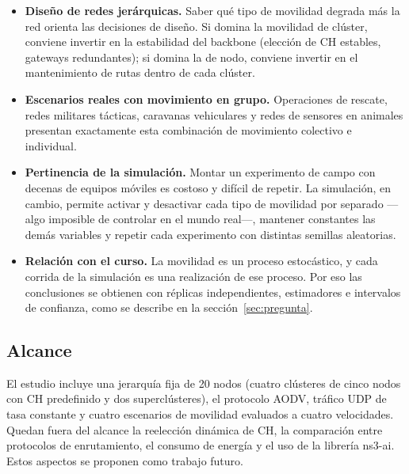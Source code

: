 \begin{itemize}
    \item \textbf{Diseño de redes jerárquicas.} Saber qué tipo de movilidad degrada más
    la red orienta las decisiones de diseño. Si domina la movilidad de clúster, conviene
    invertir en la estabilidad del backbone (elección de CH estables, gateways
    redundantes); si domina la de nodo, conviene invertir en el mantenimiento de rutas
    dentro de cada clúster.
    \item \textbf{Escenarios reales con movimiento en grupo.} Operaciones de rescate,
    redes militares tácticas, caravanas vehiculares y redes de sensores en animales
    presentan exactamente esta combinación de movimiento colectivo e individual.
    \item \textbf{Pertinencia de la simulación.} Montar un experimento de campo con
    decenas de equipos móviles es costoso y difícil de repetir. La simulación, en cambio,
    permite activar y desactivar cada tipo de movilidad por separado —algo imposible de
    controlar en el mundo real—, mantener constantes las demás variables y repetir cada
    experimento con distintas semillas aleatorias.
    \item \textbf{Relación con el curso.} La movilidad es un proceso estocástico, y cada
    corrida de la simulación es una realización de ese proceso. Por eso las conclusiones se obtienen con réplicas independientes, estimadores e
    intervalos de confianza, como se describe en la sección~\ref{sec:pregunta}.
\end{itemize}

\subsection{Alcance}

El estudio incluye una jerarquía fija de 20 nodos (cuatro clústeres de cinco nodos con
CH predefinido y dos superclústeres), el protocolo AODV, tráfico UDP de tasa constante
y cuatro escenarios de movilidad evaluados a cuatro velocidades. Quedan fuera del
alcance la reelección dinámica de CH, la comparación entre protocolos de enrutamiento,
el consumo de energía y el uso de la librería ns3-ai. Estos aspectos se proponen como trabajo futuro.
